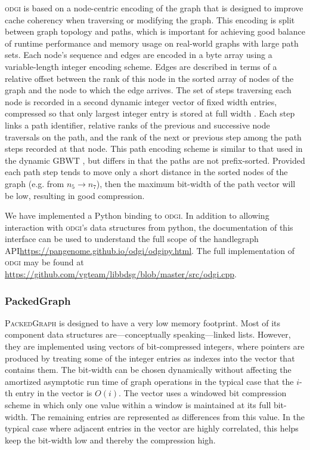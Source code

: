 \documentclass{article}
\begin{document}
\textsc{odgi} is based on a node-centric encoding of the graph that is designed to improve cache coherency when traversing or modifying the graph.
This encoding is split between graph topology and paths, which is important for achieving good balance of runtime performance and memory usage on real-world graphs with large path sets.
Each node's sequence and edges are encoded in a byte array using a variable-length integer encoding scheme.
Edges are described in terms of a relative offset between the rank of this node in the sorted array of nodes of the graph and the node to which the edge arrives.
The set of steps traversing each node is recorded in a second dynamic integer vector of fixed width entries, compressed so that only largest integer entry is stored at full width \cite{prezza2017framework}.
Each step links a path identifier, relative ranks of the previous and successive node traversals on the path, and the rank of the next or previous step among the path steps recorded at that node.
This path encoding scheme is similar to that used in the dynamic GBWT \cite{Siren_2019}, but differs in that the paths are not prefix-sorted.
Provided each path step tends to move only a short distance in the sorted nodes of the graph (e.g. from $n_{5} \to n_{7}$), then the maximum bit-width of the path vector will be low, resulting in good compression.

We have implemented a Python binding to \textsc{odgi}. 
In addition to allowing interaction with \textsc{odgi}'s data structures from python, the documentation of this interface can be used to understand the full scope of the handlegraph API\url{https://pangenome.github.io/odgi/odgipy.html}.
The full implementation of \textsc{odgi} may be found at \url{https://github.com/vgteam/libbdsg/blob/master/src/odgi.cpp}.

\subsubsection{PackedGraph}

\textsc{PackedGraph} is designed to have a very low memory footprint.
Most of its component data structures are---conceptually speaking---linked lists.
However, they are implemented using vectors of bit-compressed integers, where pointers are produced by treating some of the integer entries as indexes into the vector that contains them.
The bit-width can be chosen dynamically without affecting the amortized asymptotic run time of graph operations in the typical case that the $i$-th entry in the vector is $O(i)$.
The vector uses a windowed bit compression scheme in which only one value within a window is maintained at its full bit-width.
The remaining entries are represented as differences from this value.
In the typical case where adjacent entries in the vector are highly correlated, this helps keep the bit-width low and thereby the compression high. 
\end{document}
